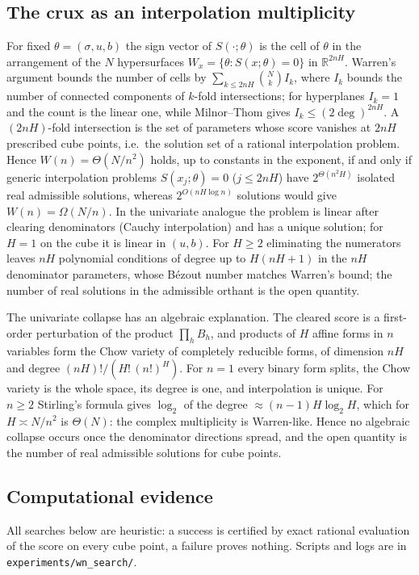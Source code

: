 \subsection{The crux as an interpolation multiplicity}
\label{sec:wn-crux}
For fixed $\theta=(\sigma,u,b)$ the sign vector of $S(\cdot;\theta)$ is the
cell of $\theta$ in the arrangement of the $N$ hypersurfaces
$W_x=\{\theta:S(x;\theta)=0\}$ in $\mathbb R^{2nH}$. Warren's argument
bounds the number of cells by $\sum_{k\le2nH}\binom NkI_k$, where $I_k$
bounds the number of connected components of $k$-fold intersections; for
hyperplanes $I_k=1$ and the count is the linear one, while
Milnor--Thom gives $I_k\le(2\deg)^{2nH}$. A $(2nH)$-fold intersection is
the set of parameters whose score vanishes at $2nH$ prescribed cube
points, i.e.\ the solution set of a rational interpolation problem.
Hence $W(n)=\Theta(N/n^2)$ holds, up to constants in the exponent, if
and only if generic interpolation problems $S(x_j;\theta)=0$
($j\le2nH$) have $2^{\Theta(n^2H)}$ isolated real admissible solutions,
whereas $2^{O(nH\log n)}$ solutions would give $W(n)=\Omega(N/n)$. In
the univariate analogue the problem is linear after clearing
denominators (Cauchy interpolation) and has a unique solution; for
$H=1$ on the cube it is linear in $(u,b)$. For $H\ge2$ eliminating the
numerators leaves $nH$ polynomial conditions of degree up to $H(nH+1)$
in the $nH$ denominator parameters, whose B\'ezout number matches
Warren's bound; the number of real solutions in the admissible orthant
is the open quantity.


The univariate collapse has an algebraic explanation. The cleared score
is a first-order perturbation of the product $\prod_hB_h$, and products
of $H$ affine forms in $n$ variables form the Chow variety of completely
reducible forms, of dimension $nH$ and degree $(nH)!/(H!\,(n!)^H)$. For
$n=1$ every binary form splits, the Chow variety is the whole space, its
degree is one, and interpolation is unique. For $n\ge2$ Stirling's
formula gives $\log_2$ of the degree $\approx(n-1)H\log_2H$, which for
$H\asymp N/n^2$ is $\Theta(N)$: the complex multiplicity is
Warren-like. Hence no algebraic collapse occurs once the denominator
directions spread, and the open quantity is the number of real
admissible solutions for cube points.


\subsection{Computational evidence}
\label{sec:wn-experiments}
All searches below are heuristic: a success is certified by exact rational
evaluation of the score on every cube point, a failure proves nothing.
Scripts and logs are in \texttt{experiments/wn\_search/}.

